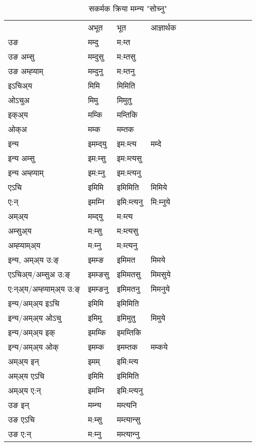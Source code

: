 \begin{table}[H]
\label{imt.vt} \centering
\caption{सकर्मक क्रिया  मम्‍न्य  "सोच्नु"  }
\begin{tabular}{l|l|l|l|l|l|l|l|l|l|l|l|l}  \toprule
&अभूत & भूत & आज्ञार्थक \\ 
उङ &मम्दु &म:म्त \\ 
उङ अम्सु&मम्दुसु &म:म्तसु \\ 
उङ अम्ह्‍याम्&मम्दुनु &म:म्तनु \\ 
इऽचिअ्य &मिमि &मिमिति   \\ 
ओऽचुअ        &मिमु &मिमुतु   \\ 
इक्अ्य&मम्कि &मम्तिकि   \\ 
ओक्अ &मम्क &मम्तक   \\ 
इन्य & इमम्द्‌यु  & इम:म्त्य &मम्दे  \\ 
इन्य अम्सु& इम:म्सु  & इम:म्त्यसु   \\ 
इन्य अम्ह्‍याम्& इम:म्‍नु  & इम:म्त्यनु   \\ 
एऽचि & इमिमि & इमिमिति &मिमिये    \\ 
ए:न् & इमम्‍नि  & इमि:म्त्यनु &मि:म्‍नुये  \\ 
अम्अ्य & मम्द्‌यु  & म:म्त्य  \\ 
अम्सुअ्य & म:म्सु & म:म्त्यसु  \\ 
अम्ह्‍याम्अ्य & म:म्‍नु  & म:म्त्यनु \\ 
\midrule
इन्य, अम्अ्य उ:ङ्‌ &इमम्ङ &इमिमत &मिमये \\ 
एऽचिअ्य/अम्सुअ उ:ङ्‌ &इमम्ङसु &इमिमतसु &मिमसुये \\ 
ए:न्अ्य/अम्ह्‍याम्अ्य उ:ङ्‌ &इमम्ङनु &इमिमतनु &मिमनुये \\ 
इन्य/अम्अ्य इऽचि &इमिमि &इमिमिति    \\ 
इन्य/अम्अ्य ओऽचु &इमिमु &इमिमुतु  &मिमुये  \\ 
इन्य/अम्अ्य इक् &इमम्कि &इमम्तिकि   \\ 
इन्य/अम्अ्य ओक् &इमम्क &इमम्तक  &मम्कये  \\ 
अम्अ्य इन् & इमम् & इमि:म्त्य   \\ 
अम्अ्य एऽचि & इमिमि & इमिमिति    \\ 
अम्अ्य ए:न् & इमम्‍नि  & इमि:म्त्यनु  \\ 
\midrule
उङ इन् & मम्‍न्य  & मम्त्यनि  \\ 
उङ एऽचि & म:म्सु  & मम्त्यान्सु   \\ 
उङ ए:न्& म:म्‍नु  & मम्त्यान्‍नु   \\ 
\bottomrule
\end{tabular}
\end{table}


